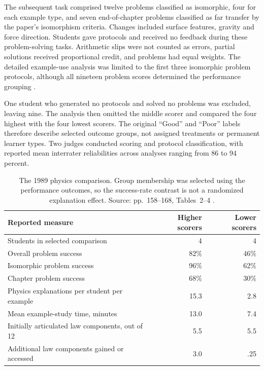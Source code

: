 The subsequent task comprised twelve problems classified as isomorphic,
four for each example type, and seven end-of-chapter problems classified
as far transfer by the paper's isomorphism criteria. Changes included
surface features, gravity and force direction. Students gave protocols and
received no feedback during these problem-solving tasks. Arithmetic slips
were not counted as errors, partial solutions received proportional credit,
and problems had equal weights. The detailed example-use analysis was
limited to the first three isomorphic problem protocols, although all
nineteen problem scores determined the performance grouping
\cite[pp.~154--158, 172--175]{ChiEtAl1989SelfExplanations}.

One student who generated no protocols and solved no problems was excluded,
leaving nine. The analysis then omitted the middle scorer and compared the
four highest with the four lowest scorers. The original ``Good'' and ``Poor''
labels therefore describe selected outcome groups, not assigned treatments
or permanent learner types. Two judges conducted scoring and protocol
classification, with reported mean interrater reliabilities across analyses
ranging from 86 to 94 percent.

\begin{table}[htbp]
\centering
\small
\begin{tabular}{p{.47\linewidth}rr}
\hline
Reported measure & Higher scorers & Lower scorers\\
\hline
Students in selected comparison & 4 & 4\\
Overall problem success & 82\% & 46\%\\
Isomorphic problem success & 96\% & 62\%\\
Chapter problem success & 68\% & 30\%\\
Physics explanations per student per example & 15.3 & 2.8\\
Mean example-study time, minutes & 13.0 & 7.4\\
Initially articulated law components, out of 12 & 5.5 & 5.5\\
Additional law components gained or accessed & 3.0 & .25\\
\hline
\end{tabular}
\caption{The 1989 physics comparison. Group membership was selected using
the performance outcomes, so the success-rate contrast is not a randomized
explanation effect. Source: pp.~158--168, Tables~2--4
\cite{ChiEtAl1989SelfExplanations}.}
\label{tab:p19-self-explanation-physics}
\end{table}

